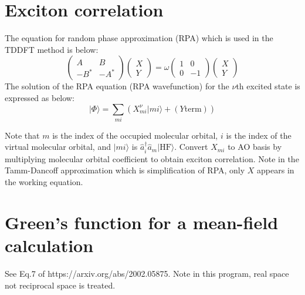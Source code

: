 \documentclass{article}
\begin{document}
\section{Exciton correlation}
The equation for random phase approximation (RPA) which is used in the TDDFT method is below:
\begin{equation}
\begin{pmatrix}
A & B \\
-B^* & -A^*
\end{pmatrix}
\begin{pmatrix}
X \\
Y
\end{pmatrix}
= \omega
\begin{pmatrix}
1 & 0 \\
0 & -1
\end{pmatrix}
\begin{pmatrix}
X \\
Y
\end{pmatrix}
\end{equation}
The solution of the RPA equation (RPA wavefunction) for the $\nu$th excited state is expressed as below:
\begin{equation}
|\Phi \rangle = \sum_{mi} (X^{\nu}_{mi}|mi\rangle + (Y \mathrm{term}))
\end{equation}

Note that $m$ is the index of the occupied molecular orbital, $i$ is the index of the virtual molecular orbital,
and $|mi\rangle$ is $\hat{a}^{\dagger}_{i}\hat{a}_{m}|\mathrm{HF}\rangle$.
Convert $X_{mi}$ to AO basis by multiplying molecular orbital coefficient to obtain exciton correlation.
Note in the Tamm-Dancoff approximation which is simplification of RPA, only $X$ appears in the working equation.

\section{Green's function for a mean-field calculation}
 See Eq.7 of https://arxiv.org/abs/2002.05875.
 Note in this program, real space not reciprocal space is treated.
\end{document}
